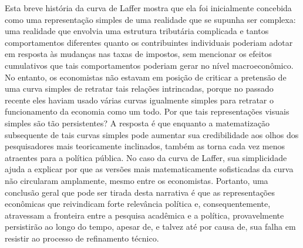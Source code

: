 \documentclass[a4paper,12pt]{article}[abntex2]
\begin{document}
Esta breve história da curva de Laffer mostra que ela foi inicialmente concebida como uma representação simples de uma realidade que se supunha ser complexa: uma realidade que envolvia uma estrutura tributária complicada e tantos comportamentos diferentes quanto os contribuintes individuais poderiam adotar em resposta às mudanças nas taxas de impostos, sem mencionar os efeitos cumulativos que tais comportamentos poderiam gerar no nível macroeconômico. No entanto, os economistas não estavam em posição de criticar a pretensão de uma curva simples de retratar tais relações intrincadas, porque no passado recente eles haviam usado várias curvas igualmente simples para retratar o funcionamento da economia como um todo. Por que tais representações visuais simples são tão persistentes? A resposta é que enquanto a matematização subsequente de tais curvas simples pode aumentar sua credibilidade aos olhos dos pesquisadores mais teoricamente inclinados, também as torna cada vez menos atraentes para a política pública. No caso da curva de Laffer, sua simplicidade ajuda a explicar por que as versões mais matematicamente sofisticadas da curva não circularam amplamente, mesmo entre os economistas. Portanto, uma conclusão geral que pode ser tirada desta narrativa é que as representações econômicas que reivindicam forte relevância política e, consequentemente, atravessam a fronteira entre a pesquisa acadêmica e a política, provavelmente persistirão ao longo do tempo, apesar de, e talvez até por causa de, sua falha em resistir ao processo de refinamento técnico.
\end{document}
